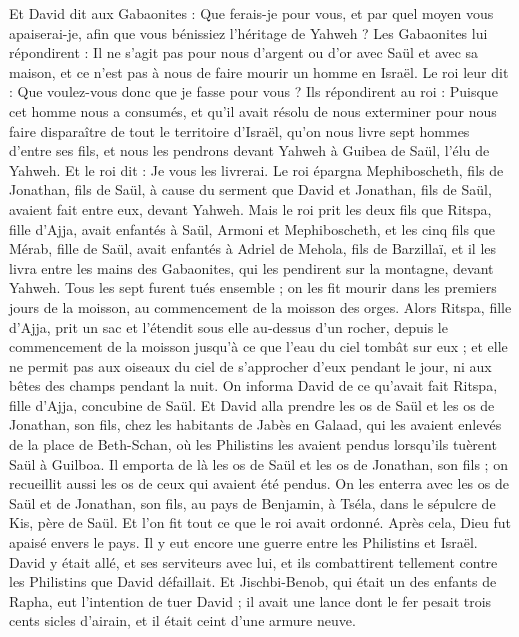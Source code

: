 \begin{multicols}{2}
Et David dit aux Gabaonites : Que ferais-je pour vous, et par quel moyen vous apaiserai-je, afin que vous bénissiez l'héritage de Yahweh ?
Les Gabaonites lui répondirent : Il ne s'agit pas pour nous d'argent ou d'or avec Saül et avec sa maison, et ce n'est pas à nous de faire mourir un homme en Israël. Le roi leur dit : Que voulez-vous donc que je fasse pour vous ?
Ils répondirent au roi : Puisque cet homme nous a consumés, et qu'il avait résolu de nous exterminer pour nous faire disparaître de tout le territoire d'Israël,
qu'on nous livre sept hommes d'entre ses fils, et nous les pendrons devant Yahweh à Guibea de Saül, l'élu de Yahweh. Et le roi dit : Je vous les livrerai.
Le roi épargna Mephiboscheth, fils de Jonathan, fils de Saül, à cause du serment que David et Jonathan, fils de Saül, avaient fait entre eux, devant Yahweh.
Mais le roi prit les deux fils que Ritspa, fille d'Ajja, avait enfantés à Saül, Armoni et Mephiboscheth, et les cinq fils que Mérab, fille de Saül, avait enfantés à Adriel de Mehola, fils de Barzillaï,
et il les livra entre les mains des Gabaonites, qui les pendirent sur la montagne, devant Yahweh. Tous les sept furent tués ensemble ; on les fit mourir dans les premiers jours de la moisson, au commencement de la moisson des orges.
Alors Ritspa, fille d'Ajja, prit un sac et l'étendit sous elle au-dessus d'un rocher, depuis le commencement de la moisson jusqu'à ce que l'eau du ciel tombât sur eux ; et elle ne permit pas aux oiseaux du ciel de s'approcher d'eux pendant le jour, ni aux bêtes des champs pendant la nuit.
On informa David de ce qu'avait fait Ritspa, fille d'Ajja, concubine de Saül.
Et David alla prendre les os de Saül et les os de Jonathan, son fils, chez les habitants de Jabès en Galaad, qui les avaient enlevés de la place de Beth-Schan, où les Philistins les avaient pendus lorsqu'ils tuèrent Saül à Guilboa.
Il emporta de là les os de Saül et les os de Jonathan, son fils ; on recueillit aussi les os de ceux qui avaient été pendus.
On les enterra avec les os de Saül et de Jonathan, son fils, au pays de Benjamin, à Tséla, dans le sépulcre de Kis, père de Saül. Et l'on fit tout ce que le roi avait ordonné. Après cela, Dieu fut apaisé envers le pays.
Il y eut encore une guerre entre les Philistins et Israël. David y était allé, et ses serviteurs avec lui, et ils combattirent tellement contre les Philistins que David défaillait.
Et Jischbi-Benob, qui était un des enfants de Rapha, eut l'intention de tuer David ; il avait une lance dont le fer pesait trois cents sicles d'airain, et il était ceint d'une armure neuve.

\end{multicols}
